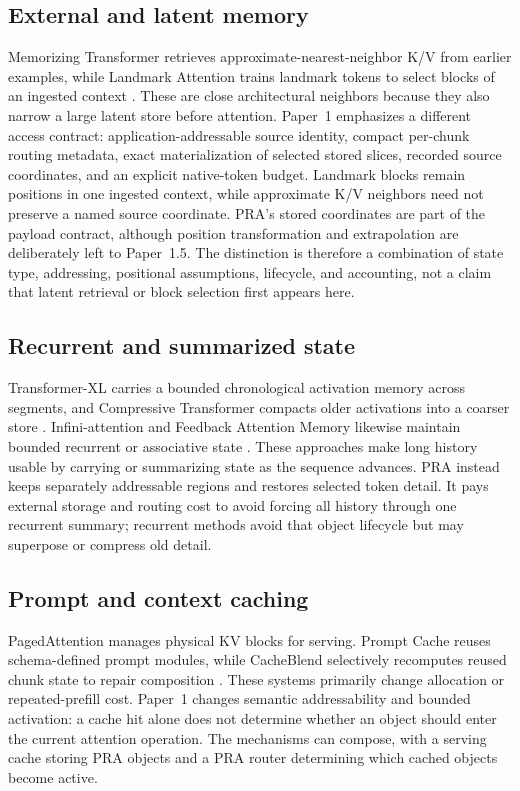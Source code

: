 \documentclass[11pt]{article}
\begin{document}
\subsection{External and latent memory}

Memorizing Transformer retrieves approximate-nearest-neighbor K/V from earlier examples,
while Landmark Attention trains landmark tokens to select blocks of an ingested context
\cite{wu2022memorizing,mohtashami2023landmark}. These are close architectural neighbors
because
they also narrow a large latent store before attention.
Paper~1 emphasizes a different access contract: application-addressable source identity,
compact per-chunk routing metadata, exact materialization of selected stored slices,
recorded source coordinates, and an explicit native-token budget.
Landmark blocks remain positions in one ingested context,
while approximate K/V neighbors need not preserve a named source coordinate.
PRA's stored coordinates are part of the payload contract,
although position transformation and extrapolation are deliberately left to Paper~1.5.
The distinction is therefore a combination of state type, addressing,
positional assumptions, lifecycle, and accounting,
not a claim that latent retrieval or block selection first appears here.

\subsection{Recurrent and summarized state}

Transformer-XL carries a bounded chronological activation memory across segments,
and Compressive Transformer compacts older activations into a coarser store
\cite{dai2019transformerxl,rae2020compressive}. Infini-attention and Feedback Attention
Memory
likewise maintain bounded recurrent or associative state
\cite{munkhdalai2024infini,hwang2024fam}. These approaches make long history usable by
carrying
or summarizing state as the sequence advances. PRA instead keeps separately addressable
regions and restores selected token detail. It pays external storage and routing cost to
avoid forcing all history through one recurrent summary;
recurrent methods avoid that object lifecycle but may superpose or compress old detail.

\subsection{Prompt and context caching}

PagedAttention manages physical KV blocks for serving.
Prompt Cache reuses schema-defined prompt modules,
while CacheBlend selectively recomputes reused chunk state to repair composition
\cite{kwon2023vllm,gim2023promptcache,yao2024cacheblend}. These systems primarily change
allocation or repeated-prefill cost. Paper~1 changes semantic addressability and bounded
activation: a cache hit alone does not determine whether an object should enter the
current attention operation. The mechanisms can compose,
with a serving cache storing PRA objects and a PRA router determining which cached
objects become active.
\end{document}
